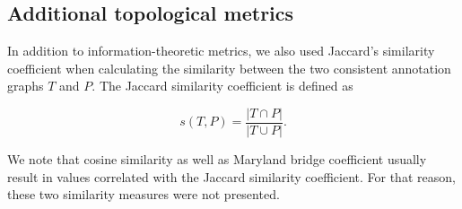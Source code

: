 \subsection{Additional topological metrics}
\label{sec:rumiAddTop}

In addition to information-theoretic metrics, we also used Jaccard's similarity coefficient \citep{jaccard1901} when calculating the similarity between the two consistent annotation graphs $T$ and $P$. The Jaccard similarity coefficient is defined as

\begin{equation}
s(T,P)=\frac{|T\cap P|}{|T\cup P|}.
\end{equation}

\noindent We note that cosine similarity as well as Maryland bridge coefficient \citep{Glazko2005} usually result in values correlated with the Jaccard similarity coefficient. For that reason, these two similarity measures were not presented.

